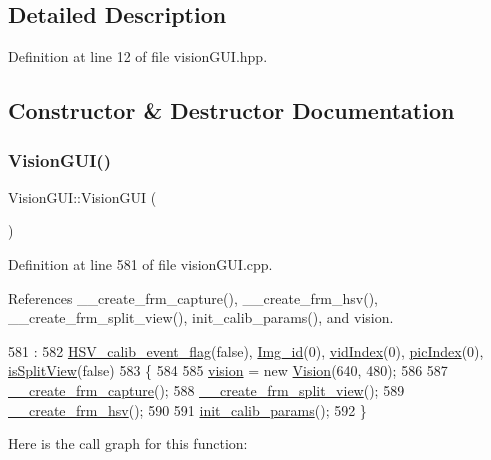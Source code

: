 \subsection{Detailed Description}


Definition at line 12 of file vision\+G\+U\+I.\+hpp.



\subsection{Constructor \& Destructor Documentation}
\mbox{\label{class_vision_g_u_i_ae6e821e61b7cf4e0aada2044a2bd2aca}} 
\subsubsection{\texorpdfstring{Vision\+G\+U\+I()}{VisionGUI()}}
{\footnotesize\ttfamily Vision\+G\+U\+I\+::\+Vision\+G\+UI (\begin{DoxyParamCaption}{ }\end{DoxyParamCaption})}



Definition at line 581 of file vision\+G\+U\+I.\+cpp.



References \+\_\+\+\_\+create\+\_\+frm\+\_\+capture(), \+\_\+\+\_\+create\+\_\+frm\+\_\+hsv(), \+\_\+\+\_\+create\+\_\+frm\+\_\+split\+\_\+view(), init\+\_\+calib\+\_\+params(), and vision.


\begin{DoxyCode}
581                      :
582   \hyperlink{class_vision_g_u_i_ac732afeda7552e0c1dc4db8d63633be2}{HSV\_calib\_event\_flag}(\textcolor{keyword}{false}), \hyperlink{class_vision_g_u_i_a4a46f114bc58e0f1d56b655f4bc8f9d8}{Img\_id}(0), \hyperlink{class_vision_g_u_i_a778e610a8026011498e6a685d88b3fbe}{vidIndex}(0), 
      \hyperlink{class_vision_g_u_i_a45478a68d6dcd492aa57b2b4a1f14e32}{picIndex}(0), \hyperlink{class_vision_g_u_i_a7706a668c306ffcfbb12fbb16e05f478}{isSplitView}(\textcolor{keyword}{false})
583 \{
584 
585     \hyperlink{class_vision_g_u_i_a36aba058af844ec6cbe0c945c616cd5f}{vision} = \textcolor{keyword}{new} \hyperlink{class_vision}{Vision}(640, 480);
586 
587     \hyperlink{class_vision_g_u_i_a9b0cac7f32fc402ce5aaff0325e39b77}{\_\_create\_frm\_capture}();
588     \hyperlink{class_vision_g_u_i_aab78b384bacc2a12d385b1baef011ed4}{\_\_create\_frm\_split\_view}();
589     \hyperlink{class_vision_g_u_i_a5022537a86f97e3eb1e037044301a0f7}{\_\_create\_frm\_hsv}();
590 
591     \hyperlink{class_vision_g_u_i_a39e2afb8ee3002e43b15758604597c9c}{init\_calib\_params}();
592 \}
\end{DoxyCode}
Here is the call graph for this function\+:
\mbox{\label{class_vision_g_u_i_ae4892f8f0cff14a0d65ee55261b08999}} 
